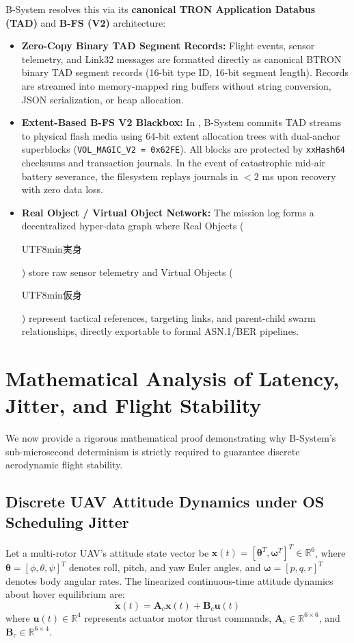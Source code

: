 \documentclass[10pt,journal,compsoc,twocolumn]{article}
\newcommand{\ja}[1]{\begin{CJK*}{UTF8}{min}#1\end{CJK*}}
\begin{document}
B-System resolves this via its \textbf{canonical TRON Application Databus (TAD)} and \textbf{B-FS (V2)} architecture:
\begin{itemize}[leftmargin=*]
    \item \textbf{Zero-Copy Binary TAD Segment Records:} Flight events, sensor telemetry, and Link32 messages are formatted directly as canonical BTRON binary TAD segment records (16-bit type ID, 16-bit segment length). Records are streamed into memory-mapped ring buffers without string conversion, JSON serialization, or heap allocation.
    \item \textbf{Extent-Based B-FS V2 Blackbox:} In , B-System commits TAD streams to physical flash media using 64-bit extent allocation trees with dual-anchor superblocks (\texttt{VOL\_MAGIC\_V2 = 0x62FE}). All blocks are protected by \texttt{xxHash64} checksums and transaction journals. In the event of catastrophic mid-air battery severance, the filesystem replays journals in $<2$ ms upon recovery with zero data loss.
    \item \textbf{Real Object / Virtual Object Network:} The mission log forms a decentralized hyper-data graph where Real Objects (\ja{実身}) store raw sensor telemetry and Virtual Objects (\ja{仮身}) represent tactical references, targeting links, and parent-child swarm relationships, directly exportable to formal ASN.1/BER pipelines.
\end{itemize}

\section{Mathematical Analysis of Latency, Jitter, and Flight Stability}
\label{sec:math}

We now provide a rigorous mathematical proof demonstrating why B-System's sub-microsecond determinism is strictly required to guarantee discrete aerodynamic flight stability.

\subsection{Discrete UAV Attitude Dynamics under OS Scheduling Jitter}
Let a multi-rotor UAV's attitude state vector be $\mathbf{x}(t) = [\boldsymbol{\theta}^T, \boldsymbol{\omega}^T]^T \in \mathbb{R}^6$, where $\boldsymbol{\theta} = [\phi, \theta, \psi]^T$ denotes roll, pitch, and yaw Euler angles, and $\boldsymbol{\omega} = [p, q, r]^T$ denotes body angular rates. The linearized continuous-time attitude dynamics about hover equilibrium are:
\begin{equation}
\label{eq:continuous_dynamics}
\dot{\mathbf{x}}(t) = \mathbf{A}_c \mathbf{x}(t) + \mathbf{B}_c \mathbf{u}(t)
\end{equation}
where $\mathbf{u}(t) \in \mathbb{R}^4$ represents actuator motor thrust commands, $\mathbf{A}_c \in \mathbb{R}^{6 \times 6}$, and $\mathbf{B}_c \in \mathbb{R}^{6 \times 4}$.
\end{document}
